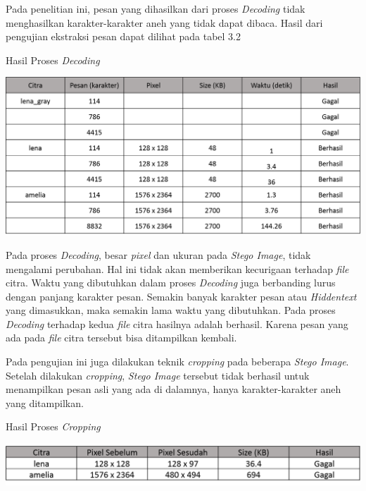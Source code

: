 	Pada penelitian ini, pesan yang dihasilkan dari proses \emph{Decoding} tidak menghasilkan karakter-karakter aneh yang tidak dapat dibaca. Hasil dari pengujian ekstraksi pesan dapat dilihat pada tabel 3.2
	 
	\begin{table}[H]
		\centering
		\caption{Hasil Proses \emph{Decoding}}
		\includegraphics[width=1.0\textwidth]{gambar/table_hasildecode3}
		\label{tabel_hasildecode3}
	\end{table}
	
	Pada proses \emph{Decoding}, besar \emph{pixel} dan ukuran pada \emph{Stego Image}, tidak mengalami perubahan. Hal ini tidak akan memberikan kecurigaan terhadap \emph{file} citra. Waktu yang dibutuhkan dalam proses \emph{Decoding} juga berbanding lurus dengan panjang karakter pesan. Semakin banyak karakter pesan atau \emph{Hiddentext} yang dimasukkan, maka semakin lama waktu yang dibutuhkan. Pada proses \emph{Decoding} terhadap kedua \emph{file} citra hasilnya adalah berhasil. Karena pesan yang ada pada \emph{file} citra tersebut bisa ditampilkan kembali.
	
	Pada pengujian ini juga dilakukan teknik \emph{cropping} pada beberapa \emph{Stego Image}. Setelah dilakukan \emph{cropping}, \emph{Stego Image} tersebut tidak berhasil untuk menampilkan pesan asli yang ada di dalamnya, hanya karakter-karakter aneh yang ditampilkan. 
	
	\begin{table}[H]
		\centering
		\caption{Hasil Proses \emph{Cropping} }
		\includegraphics[width=1.0\textwidth]{gambar/table_cropping}
		\label{tabel_cropping}
	\end{table}

